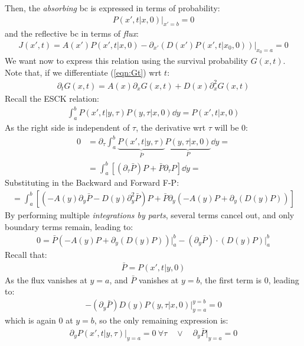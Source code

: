 \documentclass[../template.tex]{subfiles}
\begin{document}
Then, the \textit{absorbing} bc is expressed in terms of probability:
\begin{align*}
    P(x',t|x,0)\Big|_{x'=b} = 0
\end{align*}
and the reflective bc in terms of \textit{flux}:
\begin{align*}
    J(x',t) = A(x')P(x',t|x,0) - \partial_{x'} (D(x')P(x',t|x_0,0)) \Big|_{x_0 = a} =0
\end{align*} 
We want now to express this relation using the survival probability $G(x,t)$. Note that, if we differentiate (\ref{eqn:Gt}) wrt $t$:
\begin{align*}
    \partial_t G(x,t) = A(x) \partial_x G(x,t) + D(x) \partial_x^2 G(x,t)
\end{align*}   
Recall the ESCK relation:
\begin{align*}
    \int_a^b P(x',t|y,\tau) P(y, \tau|x,0) \dd{y} = P(x',t|x,0)
\end{align*}
As the right side is independent of $\tau$, the derivative wrt $\tau$  will be $0$:
\begin{align*}
    0 &= \partial_\tau \int_a^b \underbrace{P(x',t|y,\tau)}_{\bar{P}} \underbrace{P(y,\tau|x,0)}_{P} \dd{y} =\\
    &= \int_a^b [(\partial_\tau \bar{P})P + \bar{P} \partial_\tau P]\dd{y} =
\end{align*} 
Substituting in the Backward and Forward F-P:
\begin{align*}
    = \int_a^b [(-A(y) \partial_y \bar{P} - D(y) \partial_y^2 \bar{P})P + \bar{P} \partial_y (-A(y) P + \partial_y(D(y)P))]
\end{align*}
By performing multiple \textit{integrations by parts}, several terms cancel out, and only boundary terms remain, leading to:
\begin{align*}
    0 = \bar{P} (-A(y) P + \partial_y (D(y)P))\Big|_a^b - (\partial_y \bar{P})\cdot (D(y)P)\Big|_a^b 
\end{align*} 
Recall that:
\begin{align*}
    \bar{P} = P(x',t|y,0)
\end{align*}
As the flux vanishes at $y=a$, and $\bar{P}$ vanishes at $y=b$, the first term is $0$, leading to:
\begin{align*}
    -(\partial_y \bar{P})D(y)P(y,\tau|x,0)\Big|_{y=a}^{y=b} = 0
\end{align*}    
which is again $0$ at $y=b$, so the only remaining expression is:
\begin{align*}
    \partial_y P(x',t|y,\tau)\Big|_{y = a} = 0 \> \forall \tau \quad \lor \quad \partial_y \bar{P}\Big|_{y=a} = 0 
\end{align*}  
\end{document}
